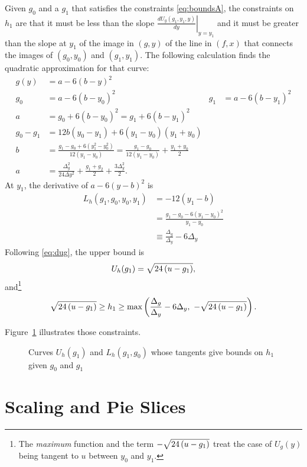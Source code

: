 \documentclass[twocolumn]{article}
\begin{document}
Given $g_0$ and a $g_1$ that satisfies the constraints
\eqref{eq:boundsA}, the constraints on $h_1$ are that it must be less
than the slope $\left. \frac{d U_g(g_1,y_1,y)}{dy} \right|_{y=y_1}$
and it must be greater than the slope at $y_1$ of the image in $(g,y)$
of the line in $(f,x)$ that connects the images of $(g_0,y_0)$ and
$(g_1,y_1)$.  The following calculation finds the quadratic
approximation for that curve:
\begin{align*}
  g(y) &= a -6(b-y)^2 \\
  g_0 &= a -6(b-y_0)^2 & g_1 &= a -6(b-y_1)^2 \\
  a &= g_0 + 6(b-y_0)^2 =  g_1 + 6(b-y_1)^2 \\
  g_0 -g_1 &= 12b(y_0-y_1) + 6(y_1-y_0)(y_1+y_0) \\
  b &= \frac{g_1-g_0 + 6 (y_1^2-y_0^2)}{12(y_1-y_0)} = \frac{g_1 -
    g_0}{12 (y_1 - y_0)} + \frac{y_1 + y_0}{2}\\
  a &= \frac{\Delta_g^2}{24 \Delta y ^2} + \frac{g_1 + g_2}{2} +
  \frac{ 3 \Delta_y^2}{2}.
\end{align*}
At $y_1$, the derivative of $a-6(y-b)^2$ is
\newcommand{\LhQ}{\frac{\Delta_g}{\Delta_y} - 6 \Delta_y}
\begin{align*}
  L_h(g_1, g_0, y_0, y_1) &= -12(y_1-b) \\
  &= \frac{g_1 - g_0 -6(y_1 - y_0)^2} {y_1-y_0} \\
  & \equiv \LhQ
\end{align*}
Following \eqref{eq:dug}, the upper bound is
\newcommand{\Uh}{\Rad{-g_1}}
\begin{equation*}
  U_h(g_1) = \Uh,
\end{equation*}
and\footnote{The \emph{maximum} function and the term $-\Uh$ treat the
case of $U_g(y)$ being tangent to $u$ between $y_0$ and $y_1$.}
\begin{equation}
  \label{eq:UL_h}
  \Uh \geq h_1 \geq \text{max}\left( \LhQ,~ -\Uh \right).
\end{equation}

Figure~\ref{fig:boundsC} illustrates those constraints.

\begin{figure}
  \centering
    \caption{Curves $U_h(g_1)$ and $L_h(g_1, g_0)$ whose tangents give
      bounds on $h_1$ given $g_0$ and $g_1$}
  \label{fig:boundsC}
\end{figure}

\section{Scaling and Pie Slices}
\label{sec:scaling}
\end{document}
